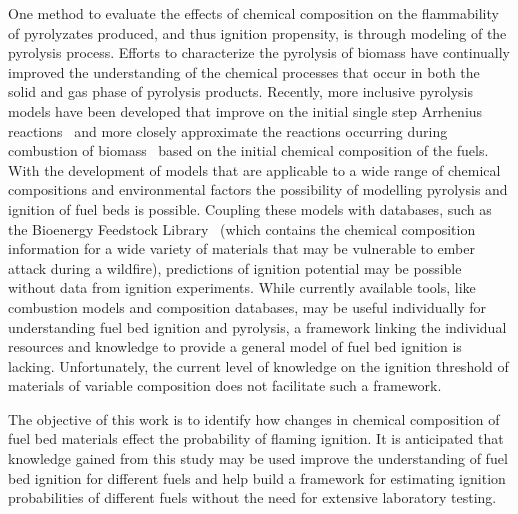     One method to evaluate the effects of chemical composition on the flammability of pyrolyzates produced, and thus ignition propensity, is through modeling of the pyrolysis process. Efforts to characterize the pyrolysis of biomass have continually improved the understanding of the chemical processes that occur in both the solid and gas phase of pyrolysis products. Recently, more inclusive pyrolysis models have been developed that improve on the initial single step Arrhenius reactions~\cite{DIBLASI199371} and more closely approximate the reactions occurring during combustion of biomass~\cite{Ranzi2008, Debiagi2015, Dhahak2019} based on the initial chemical composition of the fuels. With the development of models that are applicable to a wide range of chemical compositions and environmental factors the possibility of modelling pyrolysis and ignition of fuel beds is possible. Coupling these models with databases, such as the Bioenergy Feedstock Library~\cite{feedstock} (which contains the chemical composition information for a wide variety of materials that may be vulnerable to ember attack during a wildfire), predictions of ignition potential may be possible without data from ignition experiments. While currently available tools, like combustion models and composition databases, may be useful individually for understanding fuel bed ignition and pyrolysis, a framework linking the individual resources and knowledge to provide a general model of fuel bed ignition is lacking. Unfortunately, the current level of knowledge on the ignition threshold of materials of variable composition does not facilitate such a framework.
   
    The objective of this work is to identify how changes in chemical composition of fuel bed materials effect the probability of flaming ignition. It is anticipated that knowledge gained from this study may be used improve the understanding of fuel bed ignition for different fuels and help build a framework for estimating ignition probabilities of different fuels without the need for extensive laboratory testing.
    
    
